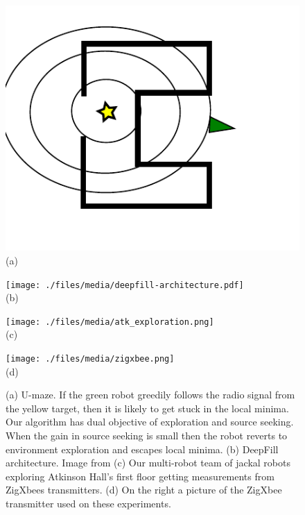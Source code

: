 
\begin{figure}
\parbox[][][b]{0.22\linewidth}{%
\centering \includegraphics[width=\linewidth]{./files/media/u-maze.pdf}\\(a)}
\parbox[][][b]{0.27\linewidth}{%
\centering \texttt{[image: ./files/media/deepfill-architecture.pdf]}\\(b)}
\parbox[][][b]{0.24\linewidth}{%
\centering \texttt{[image: ./files/media/atk\_exploration.png]}\\(c)}
\parbox[][][b]{0.24\linewidth}{%
\centering \texttt{[image: ./files/media/zigxbee.png]}\\(d)}
  \caption{
  (a) U-maze. If the green robot greedily follows the radio signal from the
  yellow target, then it is likely to get stuck in the local minima. Our
  algorithm has dual objective of exploration and source seeking. When the gain
  in source seeking is small then the robot reverts to environment exploration
  and escapes local minima.
  (b) DeepFill architecture. Image from \cite{yu2018DeepFill}
  (c) Our multi-robot team of jackal robots exploring Atkinson Hall's first floor getting measurements from ZigXbees transmitters. 
  (d) On the right a picture of the ZigXbee transmitter used on these experiments.}%
  \label{fig:exp:expl_atk}%
  \label{fig:deepfill}%
  \label{fig:c-maze}
\end{figure}

